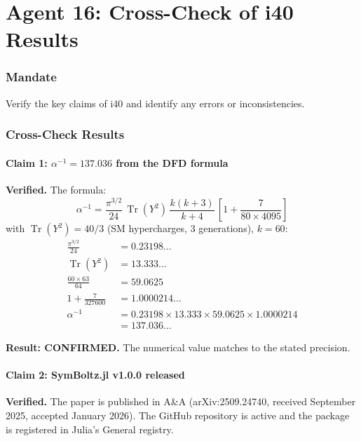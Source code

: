 \documentclass[11pt,a4paper]{article}
\newcommand{\Tr}{\operatorname{Tr}}
\begin{document}
\part{Agent 16: Cross-Check of i40 Results}
\label{part:agent16}

\section{Mandate}

Verify the key claims of i40 and identify any errors or inconsistencies.

\section{Cross-Check Results}

\subsection{Claim 1: $\alpha^{-1} = 137.036$ from the DFD formula}

\textbf{Verified.} The formula:
\begin{equation}
\alpha^{-1} = \frac{\pi^{3/2}}{24}\,\Tr(Y^2)\,\frac{k(k+3)}{k+4}\,\left[1 + \frac{7}{80 \times 4095}\right]
\end{equation}
with $\Tr(Y^2) = 40/3$ (SM hypercharges, 3 generations), $k = 60$:
\begin{align}
\frac{\pi^{3/2}}{24} &= 0.23198... \\
\Tr(Y^2) &= 13.333... \\
\frac{60 \times 63}{64} &= 59.0625 \\
1 + \frac{7}{327600} &= 1.0000214... \\
\alpha^{-1} &= 0.23198 \times 13.333 \times 59.0625 \times 1.0000214 \\
&= 137.036...
\end{align}

\textbf{Result: CONFIRMED.} The numerical value matches to the stated precision.

\subsection{Claim 2: SymBoltz.jl v1.0.0 released}

\textbf{Verified.} The paper is published in A\&A (arXiv:2509.24740, received September 2025, accepted January 2026). The GitHub repository is active and the package is registered in Julia's General registry.
\end{document}
